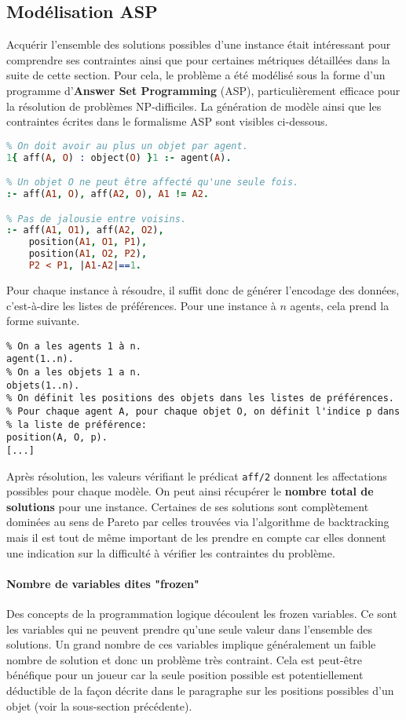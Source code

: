 \documentclass[a4paper, 11pt]{article}
\begin{document}
	\subsection{Modélisation ASP}
	Acquérir l'ensemble des solutions possibles d'une instance était intéressant pour comprendre ses contraintes ainsi que pour certaines métriques détaillées dans la suite de cette section. Pour cela, le problème a été modélisé sous la forme d'un programme d'\textbf{Answer Set Programming} (ASP), particulièrement efficace pour la résolution de problèmes NP-difficiles. La génération de modèle ainsi que les contraintes écrites dans le formalisme ASP sont visibles ci-dessous.
\begin{lstlisting}[language=Prolog]
% Génération:
% On doit avoir au plus un objet par agent.
1{ aff(A, O) : object(O) }1 :- agent(A).

% Un objet O ne peut être affecté qu'une seule fois.
:- aff(A1, O), aff(A2, O), A1 != A2.

% Pas de jalousie entre voisins.
:- aff(A1, O1), aff(A2, O2), 
	position(A1, O1, P1), 
	position(A1, O2, P2), 
	P2 < P1, |A1-A2|==1.
\end{lstlisting}
Pour chaque instance à résoudre, il suffit donc de générer l'encodage des données, c'est-à-dire les listes de préférences. Pour une instance à $n$ agents, cela prend la forme suivante.
\begin{lstlisting}
% On a les agents 1 à n.
agent(1..n).
% On a les objets 1 a n.
objets(1..n).
% On définit les positions des objets dans les listes de préférences.
% Pour chaque agent A, pour chaque objet O, on définit l'indice p dans
% la liste de préférence:
position(A, O, p).
[...]
\end{lstlisting}
Après résolution, les valeurs vérifiant le prédicat \texttt{aff/2} donnent les affectations possibles pour chaque modèle. On peut ainsi récupérer le \textbf{nombre total de solutions} pour une instance. Certaines de ses solutions sont complètement dominées au sens de Pareto par celles trouvées via l'algorithme de backtracking mais il est tout de même important de les prendre en compte car elles donnent une indication sur la difficulté à vérifier les contraintes du problème.

	\paragraph{Nombre de variables dites "frozen"}{Des concepts de la programmation logique découlent les frozen variables. Ce sont les variables qui ne peuvent prendre qu'une seule valeur dans l'ensemble des solutions. Un grand nombre de ces variables implique généralement un faible nombre de solution et donc un problème très contraint. Cela est peut-être bénéfique pour un joueur car la seule position possible est potentiellement déductible de la façon décrite dans le paragraphe sur les positions possibles d'un objet (voir la sous-section précédente).}
	
\end{document}
